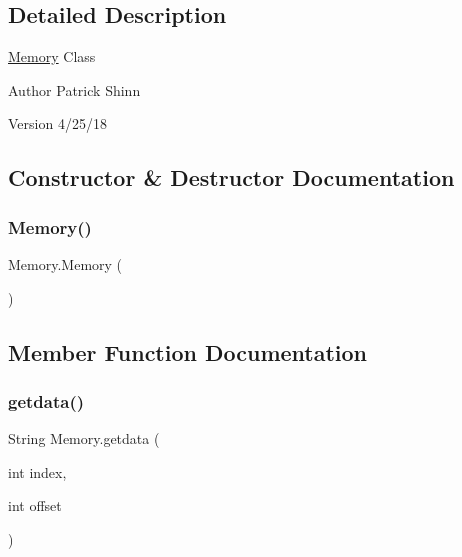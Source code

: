 \subsection{Detailed Description}
\mbox{\hyperlink{class_memory}{Memory}} Class

\begin{DoxyAuthor}{Author}
Patrick Shinn 
\end{DoxyAuthor}
\begin{DoxyVersion}{Version}
4/25/18 
\end{DoxyVersion}


\subsection{Constructor \& Destructor Documentation}
\mbox{\label{class_memory_a18ff0d806d11ea959fbb5e6357a1f63e}} 
\subsubsection{\texorpdfstring{Memory()}{Memory()}}
{\footnotesize\ttfamily Memory.\+Memory (\begin{DoxyParamCaption}{ }\end{DoxyParamCaption})\hspace{0.3cm}{\ttfamily [package]}}



\subsection{Member Function Documentation}
\mbox{\label{class_memory_ac543412608c09b39b93b1e30a3b831a2}} 
\subsubsection{\texorpdfstring{getdata()}{getdata()}}
{\footnotesize\ttfamily String Memory.\+getdata (\begin{DoxyParamCaption}\item[{int}]{index,  }\item[{int}]{offset }\end{DoxyParamCaption})\hspace{0.3cm}{\ttfamily [package]}}

\mbox{\label{class_memory_a73c54ab9efefebf18ff0d8722dbe80e3}} 
